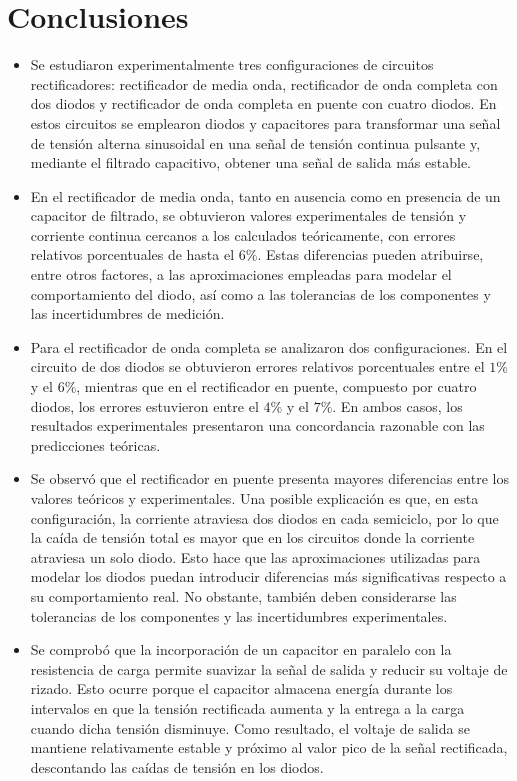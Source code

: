 \section{Conclusiones}

\begin{itemize}
\item Se estudiaron experimentalmente tres configuraciones de circuitos rectificadores: rectificador de media onda, rectificador de onda completa con dos diodos y rectificador de onda completa en puente con cuatro diodos. En estos circuitos se emplearon diodos y capacitores para transformar una señal de tensión alterna sinusoidal en una señal de tensión continua pulsante y, mediante el filtrado capacitivo, obtener una señal de salida más estable.

\item En el rectificador de media onda, tanto en ausencia como en presencia de un capacitor de filtrado, se obtuvieron valores experimentales de tensión y corriente continua cercanos a los calculados teóricamente, con errores relativos porcentuales de hasta el $6\%$. Estas diferencias pueden atribuirse, entre otros factores, a las aproximaciones empleadas para modelar el comportamiento del diodo, así como a las tolerancias de los componentes y las incertidumbres de medición.

\item Para el rectificador de onda completa se analizaron dos configuraciones. En el circuito de dos diodos se obtuvieron errores relativos porcentuales entre el $1\%$ y el $6\%$, mientras que en el rectificador en puente, compuesto por cuatro diodos, los errores estuvieron entre el $4\%$ y el $7\%$. En ambos casos, los resultados experimentales presentaron una concordancia razonable con las predicciones teóricas.

\item Se observó que el rectificador en puente presenta mayores diferencias entre los valores teóricos y experimentales. Una posible explicación es que, en esta configuración, la corriente atraviesa dos diodos en cada semiciclo, por lo que la caída de tensión total es mayor que en los circuitos donde la corriente atraviesa un solo diodo. Esto hace que las aproximaciones utilizadas para modelar los diodos puedan introducir diferencias más significativas respecto a su comportamiento real. No obstante, también deben considerarse las tolerancias de los componentes y las incertidumbres experimentales.

\item Se comprobó que la incorporación de un capacitor en paralelo con la resistencia de carga permite suavizar la señal de salida y reducir su voltaje de rizado. Esto ocurre porque el capacitor almacena energía durante los intervalos en que la tensión rectificada aumenta y la entrega a la carga cuando dicha tensión disminuye. Como resultado, el voltaje de salida se mantiene relativamente estable y próximo al valor pico de la señal rectificada, descontando las caídas de tensión en los diodos. 

\end{itemize}